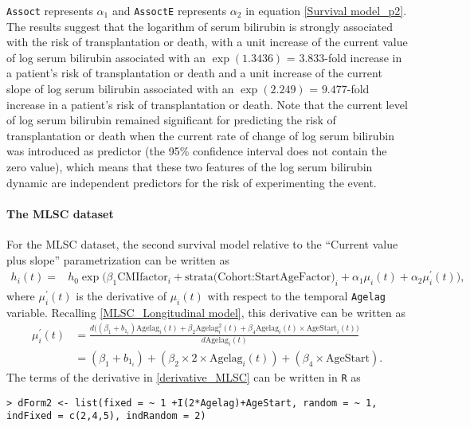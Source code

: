 \documentclass[12pt]{article}
\begin{document}
\texttt{Assoct} represents $\alpha_1$ and \texttt{AssoctE} represents $\alpha_2$ in equation \eqref{Survival model_p2}.
The results suggest that the logarithm of serum bilirubin is strongly associated with the risk of transplantation or death, with a unit increase of the current value of log serum bilirubin associated with an $\exp(1.3436)$ = $3.833$-fold increase in a patient's risk of transplantation or death and a unit increase of the current slope of log serum bilirubin associated with an $\exp(2.249)$ = $9.477$-fold increase in a patient's risk of transplantation or death. Note that the current level of log serum bilirubin remained significant for predicting the risk of transplantation or death when the current rate of change of log serum bilirubin was introduced as predictor (the 95\% confidence interval does not contain the zero value), which means that these two features of the log serum bilirubin dynamic are independent predictors for the risk of experimenting the event.

\paragraph{The MLSC dataset}

For the MLSC dataset, the second survival model relative to the ``Current value plus slope'' parametrization can be written as
\begin{equation}
\begin{split}
h_i(t) = &h_0 \exp \big(\beta_1 \text{CMIfactor}_i + \text{strata(Cohort:StartAgeFactor)}_i  + \alpha_1 \mu_i(t)+\alpha_2 \mu_i^{'}(t)\big),
\end{split}
\label{Survival model_mlsc2}
\end{equation}
where $\mu_i^{'}(t)$ is the derivative of $\mu_i(t)$ with respect to the temporal \texttt{Agelag} variable. Recalling \eqref{MLSC_Longitudinal model}, this derivative can be written as
\begin{equation}
\begin{aligned}
\mu_i^{'}(t)&=\frac{d\big((\beta_1+b_{1_{i}} )\text{Agelag}_i(t)+\beta_2 \text{Agelag}_i^2(t)
+\beta_4 \text{Agelag}_i(t) \times \text{AgeStart}_i(t)\big)}{d\text{Agelag}_i(t)}\\
&=(\beta_1+b_{1_{i}})+(\beta_2 \times 2 \times \text{Agelag}_i(t))+(\beta_4 \times \text{AgeStart} ).
\end{aligned}
\label{derivative_MLSC}
\end{equation}
The terms of the derivative in \eqref{derivative_MLSC} can be written in \texttt{R} as
\begin{verbatim}
> dForm2 <- list(fixed = ~ 1 +I(2*Agelag)+AgeStart, random = ~ 1,
indFixed = c(2,4,5), indRandom = 2)
\end{verbatim}
\end{document}

